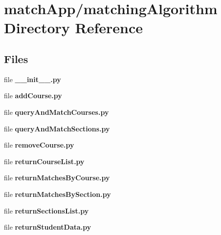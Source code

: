 \section{match\+App/matching\+Algorithm Directory Reference}
\label{dir_097cc2a858efa3a880098bb687612e07}
\subsection*{Files}
\begin{DoxyCompactItemize}
\item 
file {\bf \+\_\+\+\_\+init\+\_\+\+\_\+.\+py}
\item 
file {\bf add\+Course.\+py}
\item 
file {\bf query\+And\+Match\+Courses.\+py}
\item 
file {\bf query\+And\+Match\+Sections.\+py}
\item 
file {\bf remove\+Course.\+py}
\item 
file {\bf return\+Course\+List.\+py}
\item 
file {\bf return\+Matches\+By\+Course.\+py}
\item 
file {\bf return\+Matches\+By\+Section.\+py}
\item 
file {\bf return\+Sections\+List.\+py}
\item 
file {\bf return\+Student\+Data.\+py}
\end{DoxyCompactItemize}
